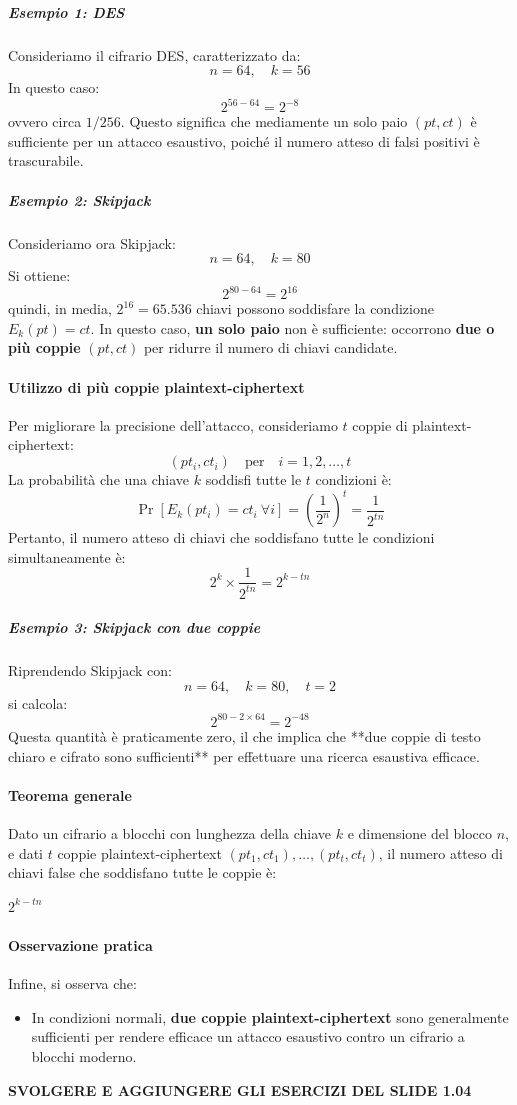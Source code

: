 \documentclass{report}
\begin{document}
\subparagraph{Esempio 1: DES}

Consideriamo il cifrario DES, caratterizzato da:
\[
n = 64, \quad k = 56
\]
In questo caso:
\[
2^{56-64} = 2^{-8}
\]
ovvero circa $1/256$.  
Questo significa che mediamente un solo paio $(pt, ct)$ è sufficiente per un attacco esaustivo, poiché il numero atteso di falsi positivi è trascurabile.

\subparagraph{Esempio 2: Skipjack}

Consideriamo ora Skipjack:
\[
n = 64, \quad k = 80
\]
Si ottiene:
\[
2^{80-64} = 2^{16}
\]
quindi, in media, $2^{16} = 65.536$ chiavi possono soddisfare la condizione $E_k(pt) = ct$.  
In questo caso, \textbf{un solo paio} non è sufficiente: occorrono \textbf{due o più coppie} $(pt, ct)$ per ridurre il numero di chiavi candidate.

\paragraph{Utilizzo di più coppie plaintext-ciphertext}

Per migliorare la precisione dell'attacco, consideriamo $t$ coppie di plaintext-ciphertext:
\[
(pt_i, ct_i) \quad \text{per} \quad i = 1,2,\dots,t
\]
La probabilità che una chiave $k$ soddisfi tutte le $t$ condizioni è:
\[
\Pr\left[E_k(pt_i) = ct_i\ \forall i\right] = \left( \frac{1}{2^n} \right)^t = \frac{1}{2^{tn}}
\]
Pertanto, il numero atteso di chiavi che soddisfano tutte le condizioni simultaneamente è:
\[
2^k \times \frac{1}{2^{tn}} = 2^{k-tn}
\]

\subparagraph{Esempio 3: Skipjack con due coppie}

Riprendendo Skipjack con:
\[
n = 64, \quad k = 80, \quad t = 2
\]
si calcola:
\[
2^{80 - 2\times64} = 2^{-48}
\]
Questa quantità è praticamente zero, il che implica che **due coppie di testo chiaro e cifrato sono sufficienti** per effettuare una ricerca esaustiva efficace.

\paragraph{Teorema generale}
Dato un cifrario a blocchi con lunghezza della chiave $k$ e dimensione del blocco $n$, e dati $t$ coppie plaintext-ciphertext $(pt_1, ct_1), \dots, (pt_t, ct_t)$, il numero atteso di chiavi false che soddisfano tutte le coppie è:

$2^{k - tn}$


\paragraph{Osservazione pratica}

Infine, si osserva che:
\begin{itemize}
    \item In condizioni normali, \textbf{due coppie plaintext-ciphertext} sono generalmente sufficienti per rendere efficace un attacco esaustivo contro un cifrario a blocchi moderno.
\end{itemize}


\textbf{SVOLGERE E AGGIUNGERE GLI ESERCIZI DEL SLIDE 1.04}

  
\end{document}
